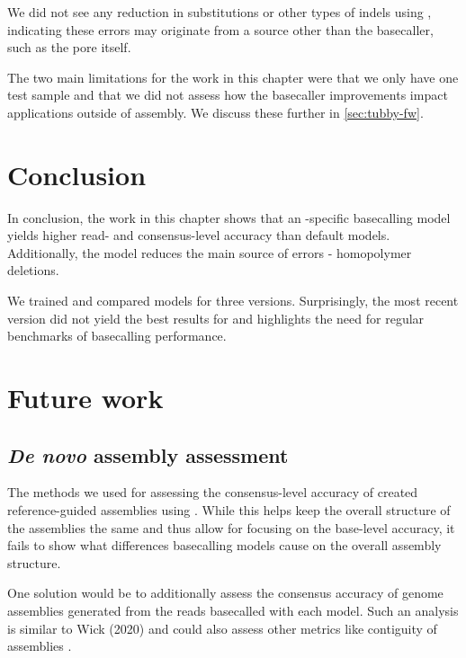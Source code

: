 We did not see any reduction in substitutions or other types of indels using \tubby{}, indicating these errors may originate from a source other than the basecaller, such as the pore itself.

\noindent
The two main limitations for the work in this chapter were that we only have one test sample and that we did not assess how the basecaller improvements impact applications outside of assembly. We discuss these further in \autoref{sec:tubby-fw}.


\section{Conclusion}
In conclusion, the work in this chapter shows that an \mtb{}-specific \ont{} basecalling model yields higher read- and consensus-level accuracy than default models. Additionally, the \mtb{} model reduces the main source of \ont{} errors - homopolymer deletions.

We trained and compared models for three \guppy{} versions. Surprisingly, the most recent version did not yield the best results for \mtb{} and highlights the need for regular benchmarks of \ont{} basecalling performance.

\section{Future work}
\label{sec:tubby-fw}

\subsection{\textit{De novo} assembly assessment}
The methods we used for assessing the consensus-level accuracy of \tubby{} created reference-guided assemblies using . While this helps keep the overall structure of the assemblies the same and thus allow for focusing on the base-level accuracy, it fails to show what differences basecalling models cause on the overall assembly structure.

One solution would be to additionally assess the consensus accuracy of \denovo{} genome assemblies generated from the \ont{} reads basecalled with each model. Such an analysis is similar to Wick \etal{} (2020) and could also assess other metrics like contiguity of assemblies \cite{wick2020}.

